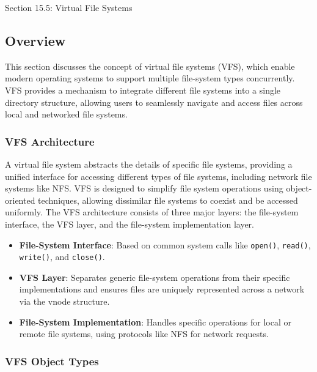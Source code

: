 \begin{notes}{Section 15.5: Virtual File Systems}
    \subsection*{Overview}

    This section discusses the concept of virtual file systems (VFS), which enable modern operating systems to support multiple file-system types concurrently. VFS provides a mechanism to integrate 
    different file systems into a single directory structure, allowing users to seamlessly navigate and access files across local and networked file systems.
    
    \subsubsection*{VFS Architecture}
    
    A virtual file system abstracts the details of specific file systems, providing a unified interface for accessing different types of file systems, including network file systems like NFS. VFS is 
    designed to simplify file system operations using object-oriented techniques, allowing dissimilar file systems to coexist and be accessed uniformly. The VFS architecture consists of three major 
    layers: the file-system interface, the VFS layer, and the file-system implementation layer.
    
    \begin{highlight}
    
        \begin{itemize}
            \item \textbf{File-System Interface}: Based on common system calls like \texttt{open()}, \texttt{read()}, \texttt{write()}, and \texttt{close()}.
            \item \textbf{VFS Layer}: Separates generic file-system operations from their specific implementations and ensures files are uniquely represented across a network via the vnode structure.
            \item \textbf{File-System Implementation}: Handles specific operations for local or remote file systems, using protocols like NFS for network requests.
        \end{itemize}
    
    \end{highlight}
    
    \subsubsection*{VFS Object Types}
    

\end{notes}
